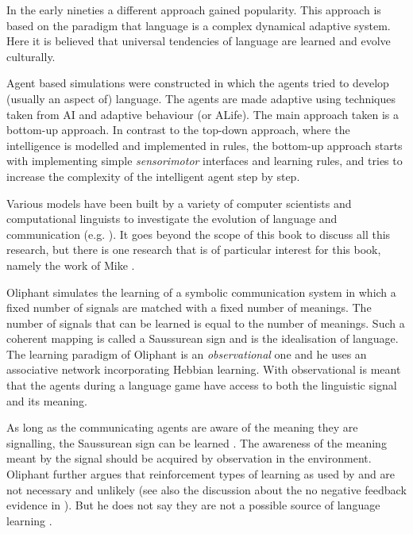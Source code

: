 In the early nineties a different approach gained popularity. This approach is based on the paradigm that language is a complex dynamical adaptive system. Here it is believed that universal tendencies of language are learned and evolve culturally.

Agent based simulations were constructed in which the agents tried to develop (usually an aspect of) language. The agents are made adaptive using techniques taken from AI and adaptive behaviour (or ALife). The main approach taken is a bottom-up approach. In contrast to the top-down approach, where the intelligence is modelled and implemented in rules, the bottom-up approach starts with implementing simple {\em sensorimotor} interfaces and learning rules, and tries to increase the complexity of the intelligent agent step by step.



Various models have been built by a variety of computer scientists and computational linguists to investigate the evolution of language and communication (e.g. \citealt{cangelosiparisi:1998,kirby:1997,maclennan:1991,oliphant:1997,wernerdyer:1991}). It goes beyond the scope of this book to discuss all this research, but there is one research that is of particular interest for this book, namely the work of Mike \citet{oliphant:1997,oliphant:1998,oliphant:2000}.

Oliphant simulates the learning of a symbolic communication system in which a fixed number of signals are matched with a fixed number of meanings. The number of signals that can be learned is equal to the number of meanings. Such a coherent mapping is called a Saussurean sign \citep{saussure:1974} and is the idealisation of language. The learning paradigm of Oliphant is an {\em observational} one and he uses an associative network incorporating Hebbian learning. With observational is meant that the agents during a language game have access to both the linguistic signal and its meaning.

As long as the communicating agents are aware of the meaning they are signalling, the Saussurean sign can be learned \citep{oliphant:1997,oliphant:2000}. The awareness of the meaning meant by the signal should be acquired by observation in the environment. Oliphant further argues that reinforcement types of learning as used by \citet{yancostein} and \citet{steels:1996a} are not necessary and unlikely (see also the discussion about the no negative feedback evidence in ). But he does not say they are not a possible source of language learning \citep{oliphant:2000}.

